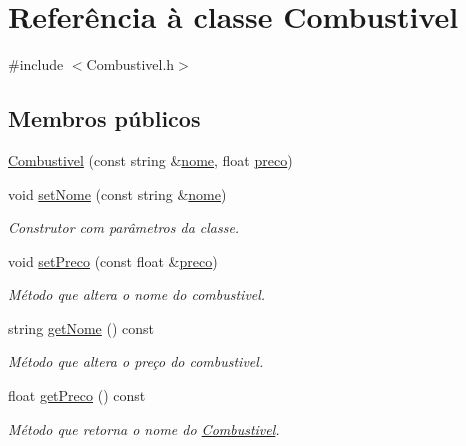 \hypertarget{class_combustivel}{\section{Referência à classe Combustivel}
\label{class_combustivel}
}


{\ttfamily \#include $<$Combustivel.\+h$>$}

\subsection*{Membros públicos}
\begin{DoxyCompactItemize}
\item 
\hyperlink{class_combustivel_a101e8181fe6c4e21aa3c73cd3888467e}{Combustivel} (const string \&\hyperlink{class_combustivel_adfa329c4c4b60abcb87c1f3c82be4145}{nome}, float \hyperlink{class_combustivel_ac910a8410930ba553861f584da9f48d1}{preco})
\item 
void \hyperlink{class_combustivel_a0f1311345a421884cf290b413e1df9b4}{set\+Nome} (const string \&\hyperlink{class_combustivel_adfa329c4c4b60abcb87c1f3c82be4145}{nome})
\begin{DoxyCompactList}\small\item\em Construtor com parâmetros da classe. \end{DoxyCompactList}\item 
void \hyperlink{class_combustivel_ac0ddd40d9511ca92c5d44a9e4f503d95}{set\+Preco} (const float \&\hyperlink{class_combustivel_ac910a8410930ba553861f584da9f48d1}{preco})
\begin{DoxyCompactList}\small\item\em Método que altera o nome do combustivel. \end{DoxyCompactList}\item 
string \hyperlink{class_combustivel_a20ab48a38371dedfc40ca4b5e11dbb5e}{get\+Nome} () const 
\begin{DoxyCompactList}\small\item\em Método que altera o preço do combustivel. \end{DoxyCompactList}\item 
float \hyperlink{class_combustivel_a7e4bbd943b0534fc2c1fdf3ce6861f14}{get\+Preco} () const 
\begin{DoxyCompactList}\small\item\em Método que retorna o nome do \hyperlink{class_combustivel}{Combustivel}. \end{DoxyCompactList}\item 

\end{DoxyCompactItemize}
